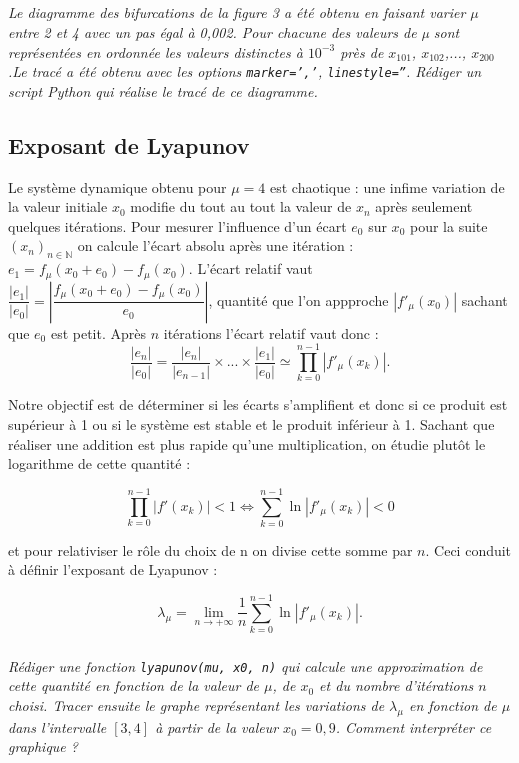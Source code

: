 \subparagraph{}\textit{Le diagramme des bifurcations de la figure 3 a été obtenu en faisant varier $\mu$ entre 2 et 4 avec un pas égal à 0,002. Pour chacune des valeurs de µ sont représentées en ordonnée les valeurs distinctes à $10^{-3}$ près de $x_{101}$, $x_{102}$,..., $x_{200}$.Le tracé a été obtenu avec les options \texttt{marker=','}, \texttt{linestyle=''}. Rédiger un script Python qui réalise le tracé de ce diagramme.}


\subsection*{Exposant de Lyapunov}

Le système dynamique obtenu pour $\mu = 4$ est chaotique : une infime variation de la valeur initiale $x_0$ modifie du tout
au tout la valeur de  $x_n$ après seulement quelques itérations. Pour mesurer l’influence d’un écart $e_0$ sur $x_0$ pour la suite
 $\left( x_n \right)_{n\in \mathbb{N}}$ on calcule l’écart absolu après une itération : $e_1 = f_{\mu}(x_0 + e_0) - f_{\mu}(x_0)$. L’écart relatif vaut $\dfrac{|e_1|}{|e_0|}=\left| \dfrac{f_{\mu}\left( x_0 +e_0\right)-f_{\mu}\left(x_0\right) }{e_0} \right|$,  quantité que l'on appproche $\left| f'_{\mu}\left( x_0\right) \right|$ sachant que $e_0$ est petit. Après $n$ itérations l'écart relatif vaut donc : 
$$
\dfrac{|e_n|}{|e_0|} =\dfrac{|e_n|}{\left| e_{n-1} \right|} \times ... \times \dfrac{|e_1|}{\left| e_{0} \right|} \simeq \prod \limits_{k=0}^{n-1} \left| f'_{\mu}\left(x_k\right)\right|.
$$

Notre objectif est de déterminer si les écarts s’amplifient et donc si ce produit est supérieur à 1 ou si le système est stable
et le produit inférieur à 1. Sachant que réaliser une addition est plus rapide qu’une multiplication, on étudie plutôt le
logarithme de cette quantité :

$$
\prod \limits_{k=0}^{n-1} \left| f'\left(x_k\right)\right|<1 
\Leftrightarrow
\sum \limits_{k=0}^{n-1} \ln \left| f'_{\mu}  \left(x_k\right)\right|<0 
$$

et pour relativiser le rôle du choix de n on divise cette somme par $n$.
Ceci conduit à définir l’exposant de Lyapunov :

$$\lambda_ {\mu} =  \lim\limits_{n\to +\infty}\dfrac{1}{n} \sum_{k=0}^{n-1} \ln \left| f'_{\mu}  \left(x_k\right)\right| .$$

\subparagraph{}\textit{Rédiger une fonction \texttt{lyapunov(mu, x0, n)} qui calcule une approximation de cette quantité en fonction
de la valeur de $\mu$, de $x_0$ et du nombre d’itérations $n$ choisi.
Tracer ensuite le graphe représentant les variations de $\lambda_{\mu}$ en fonction de $\mu$ dans l’intervalle $[3,4]$ à partir de la valeur $x_0 = 0,9$. Comment interpréter ce graphique ?}


